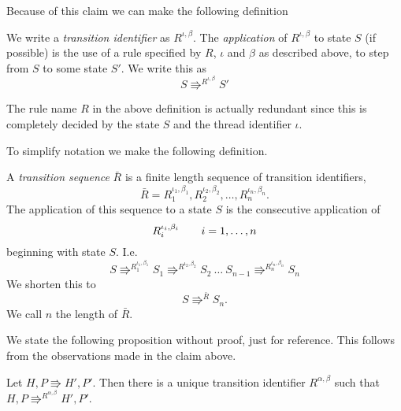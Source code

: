 Because of this claim we can make the following definition

\begin{definition} \label{def:trans_id}
  We write a \emph{transition identifier} as $R^{\iota, \beta}$. The
  \emph{application} of $R^{\iota, \beta}$ to state $S$ (if possible) is the
  use of a rule specified by $R$, $\iota$ and $\beta$ as described above, to
  step from $S$ to some state $S'$. We write this as
  \begin{equation*}
    S \Rrightarrow^{R^{\iota, \beta}} S'
  \end{equation*}
\end{definition}

\begin{remark}
  The rule name $R$ in the above definition is actually redundant since this is
  completely decided by the state $S$ and the thread identifier $\iota$.
\end{remark}

To simplify notation we make the following definition.

\begin{definition}
  A \emph{transition sequence} $\bar{R}$ is a finite length sequence of
  transition identifiers,
  \begin{equation*}
    \bar{R} = R_1^{\iota_1, \beta_1}, R_2^{\iota_2, \beta_2}, \dots,
    R_n^{\iota_n, \beta_n}.
  \end{equation*}
  The application of this sequence to a state $S$ is the consecutive application
  of
  \begin{equation*}
    R_i^{\iota_i, \beta_i} \quad\quad i = 1, \dots, n
  \end{equation*}
  beginning with state $S$. I.e.
  \begin{equation*} 
    S \Rrightarrow^{R_1^{\iota_1, \beta_1}} S_1 \Rrightarrow^{R^{\iota_2,
    \beta_2}} S_2  \: \dots \: S_{n-1} \Rrightarrow^{R_n^{\iota_n, \beta_n}} S_n
  \end{equation*}
  We shorten this to
  \begin{equation*}
    S \Rrightarrow^{\bar{R}} S_n.
  \end{equation*}
  We call $n$ the length of $\bar{R}$.
\end{definition}

We state the following proposition without proof, just for reference. This
follows from the observations made in the claim above.
\begin{proposition} \label{prop:uniq_trans}
  Let $H, P \Rrightarrow H', P'$. Then there is a unique transition identifier
  $R^{\alpha, \beta}$ such that $H, P \Rrightarrow^{R^{\alpha, \beta}} H', P'$.
\end{proposition}

